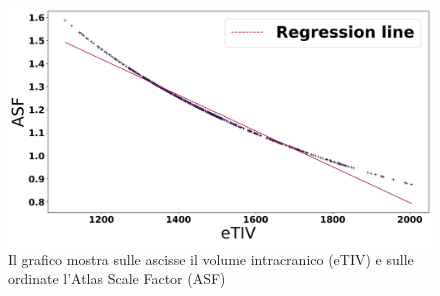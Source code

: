 \begin{figure}[H]
    \centering
    \includegraphics[height=0.55 \linewidth]{eTIV_ASF.png}
    \caption{Il grafico mostra sulle ascisse il volume intracranico (eTIV) e sulle ordinate l'Atlas Scale Factor (ASF)}
    \label{fig:conf sperimentale}
\end{figure}











